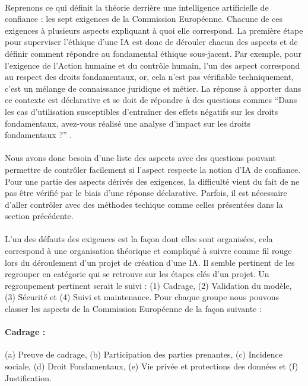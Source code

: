 \documentclass[10pt, french, a4paper]{report}
\begin{document}
\paragraph{}
Reprenons ce qui définit la théorie derrière une intelligence artificielle de confiance : les sept exigences de la Commission Européenne. Chacune de ces exigences à plusieurs aspects expliquant à quoi elle correspond. La première étape pour superviser l'éthique d'une IA est donc de dérouler chacun des aspects et de définir comment répondre au fondamental éthique sous-jacent. Par exemple, pour l'exigence de l'Action humaine et du contrôle humain, l'un des aspect correspond au respect des droits fondamentaux, or, cela n'est pas vérifiable techniquement, c'est un mélange de connaissance juridique et métier. La réponse à apporter dans ce contexte est déclarative et se doit de répondre à des questions commes  ``Dans les cas d’utilisation susceptibles d’entraîner des effets négatifs sur les droits fondamentaux, avez-vous réalisé une analyse d’impact sur les droits fondamentaux ?'' \citep{commission_europeenne_ethics_2019}.

\paragraph{}
Nous avons donc besoin d'une liste des aspects avec des questions pouvant permettre de contrôler facilement si l'aspect respecte la notion d'IA de confiance. Pour une partie des aspects dérivés des exigences, la difficulté vient du fait de ne pas être vérifié par le biais d'une réponse déclarative. Parfois, il est nécessaire d'aller contrôler avec des méthodes techique comme celles présentées dans la section précédente.

\paragraph{}
L'un des défauts des exigences est la façon dont elles sont organisées, cela correspond à une organisation théorique et compliqué à suivre comme fil rouge lors du déroulement d'un projet de création d'une IA. Il semble pertinent de les regrouper en catégorie qui se retrouve sur les étapes clés d'un projet. Un regroupement pertinent serait le suivi : (1) Cadrage, (2) Validation du modèle, (3) Sécurité et (4) Suivi et maintenance. Pour chaque groupe nous pouvons classer les aspects de la Commission Européenne de la façon suivante :

\paragraph{Cadrage :} (a) Preuve de cadrage, (b) Participation des parties prenantes, (c) Incidence sociale, (d) Droit Fondamentaux, (e) Vie privée et protections des données et (f) Justification.
\end{document}

